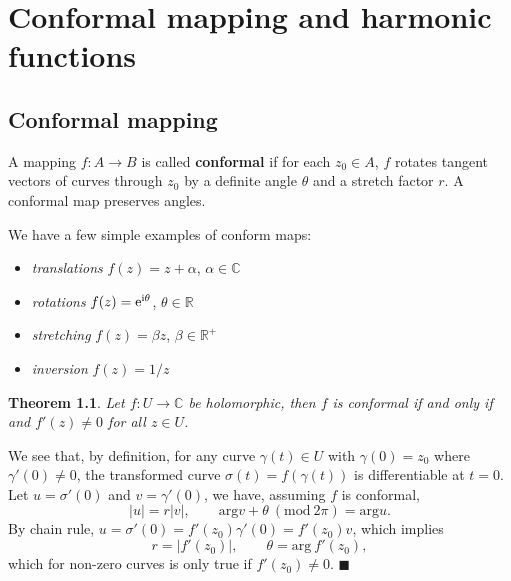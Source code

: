 \documentclass[letter-paper]{tufte-book}
\newtheorem{theorem}{\color{pastel-blue}Theorem}[section]
\newenvironment{proof}[1][Proof]{\begin{trivlist}
\item[\hskip \labelsep {\bfseries #1}]}{\end{trivlist}}
\newenvironment{example}[1][Example]{\begin{trivlist}
\item[\hskip \labelsep {\bfseries #1}]}{\end{trivlist}}
\newcommand{\ex}{\mathrm{e}}
\newcommand{\zi}{{\rm i}}
\newcommand{\qed}{\hfill$\blacksquare$}
\begin{document}

\chapter{Conformal mapping and harmonic functions}

\section{Conformal mapping}

A mapping $f: A \to B$ is called \textbf{conformal} if for each $z_0 \in A$, $f$
rotates tangent vectors of curves through $z_0$ by a definite angle $\theta$ and
a stretch factor $r$. A conformal map preserves angles.

\begin{example}
  We have a few simple examples of conform maps:
  \begin{itemize}
    \item \emph{translations} $f(z) = z+\alpha$, $\alpha \in \mathbb{C}$
    \item \emph{rotations} $f(z) = \ex^{\zi \theta}$, $\theta \in \mathbb{R}$
    \item \emph{stretching} $f(z) = \beta z$, $\beta \in \mathbb{R}^+$
    \item \emph{inversion} $f(z) = 1/z$
  \end{itemize}
\end{example}

\begin{theorem}
  Let $f: U \to \mathbb{C}$ be holomorphic, then $f$ is conformal if and only if
  and $f'(z) \neq 0$ for all $z\in U$.
\end{theorem}

\begin{proof}
  We see that, by definition, for any curve $\gamma(t) \in U$ with $\gamma(0) =
  z_0$ where $\gamma'(0) \neq 0$, the transformed curve $\sigma(t) =
  f(\gamma(t))$ is differentiable at $t=0$. Let $u = \sigma'(0)$ and $v =
  \gamma'(0)$, we have, assuming $f$ is conformal,
  \begin{equation*}
    |u| = r|v|, \qquad \mathrm{arg} v + \theta\ (\mathrm{mod}\ 2\pi) = \mathrm{arg} u.
  \end{equation*}
  By chain rule, $u = \sigma'(0) = f'(z_0) \gamma'(0) = f'(z_0) v$, which
  implies
  \begin{equation*}
    r = |f'(z_0)|, \qquad \theta = \mathrm{arg}\ f'(z_0),
  \end{equation*}
  which for non-zero curves is only true if $f'(z_0) \neq 0$. \qed
\end{proof}
\end{document}
